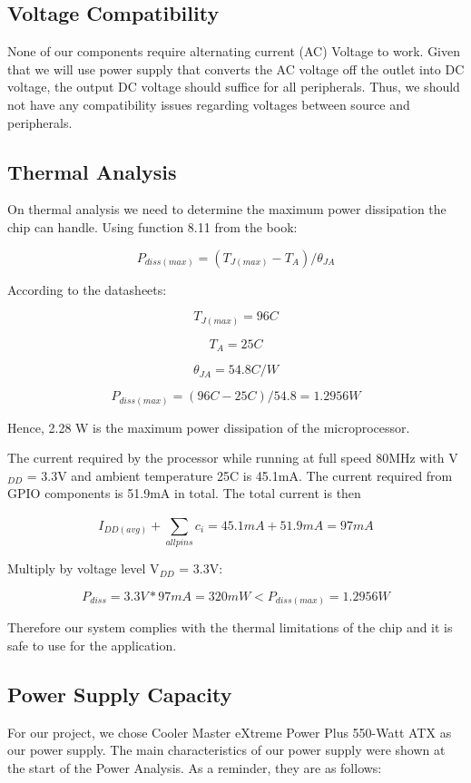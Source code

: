 	\subsection{Voltage Compatibility}

		None of our components require alternating current (AC) Voltage to work. Given that we will use power supply that converts the AC voltage off the outlet into DC voltage, the output DC voltage should suffice for all peripherals. Thus, we should not have any compatibility issues regarding voltages between source and peripherals. 

	\subsection{Thermal Analysis}

		On thermal analysis we need to determine the maximum power dissipation the chip can handle. Using function 8.11 from the book:

				$$P_{diss(max)}=(T_{J(max)}-T_{A})/\theta_{JA}$$

		According to the datasheets:

				$$T_{J(max)} = 96 C$$
				
				$$T_{A} = 25 C$$

				$$\theta_{JA}=54.8 C/W$$

				$$P_{diss(max)}=(96C-25C) / 54.8 = 1.2956 W $$

		Hence, 2.28 W is the maximum power dissipation of the microprocessor.

		The current required by the processor while running at full speed 80MHz with V$_{DD}$ = 3.3V and ambient temperature 25C is 45.1mA. The current required from GPIO components is 51.9mA in total. The total current is then

			$$I_{DD(avg)} + \sum_{allpins}^{} c_i = 45.1mA + 51.9mA = 97 mA$$

		Multiply by voltage level V$_{DD}$ = 3.3V:

			$$P_{diss}= 3.3V * 97mA = 320 mW < P_{diss(max)}= 1.2956 W $$

		Therefore our system complies with the thermal limitations of the chip and it is safe to use for the application.


	\subsection{Power Supply Capacity}

		For our project, we chose Cooler Master eXtreme Power Plus 550-Watt ATX as our power supply. The main characteristics of our power supply were shown at the start of the Power Analysis. As a reminder, they are as follows: 


